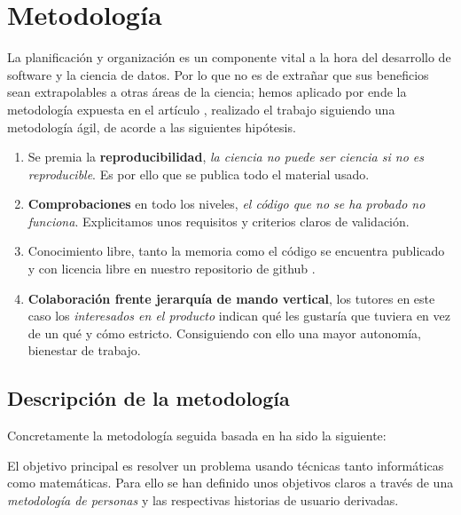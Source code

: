 %

\chapter{Metodología}

La planificación y organización es un componente vital a la hora del desarrollo de software 
y la ciencia de datos. Por lo que no es de extrañar que sus beneficios sean extrapolables
a otras áreas de la ciencia; 
hemos aplicado por ende la 
metodología expuesta en el artículo \cite{DBLP:journals/corr/abs-2104-12545}, realizado 
el trabajo siguiendo una metodología ágil, de acorde a las siguientes hipótesis. 

\begin{enumerate}
    \item Se premia la \textbf{reproducibilidad}, \textit{la ciencia no puede ser ciencia si no es reproducible}. Es por 
    ello que se publica todo el material usado. 
    \item \textbf{Comprobaciones} en todo los niveles, \textit{el código que no se ha probado no funciona}. 
    Explicitamos unos requisitos y criterios claros de validación. 
    \item Conocimiento libre, tanto la memoria como el código se encuentra publicado y con licencia libre en nuestro repositorio 
    de github \cite{TFG-Estudio-de-las-redes-neuronales}.
    \item \textbf{Colaboración frente jerarquía de mando vertical}, los tutores en este caso 
    los \textit{interesados en el producto} 
    indican qué les gustaría que tuviera en vez de un qué y cómo estricto. Consiguiendo con ello una mayor autonomía, bienestar de trabajo.
     
\end{enumerate}  

\section{Descripción de la metodología }  

Concretamente la metodología seguida basada en \cite{que-es-un-trabajo-fin-de-x} ha sido la siguiente: 

El objetivo principal es resolver un problema usando técnicas tanto informáticas como matemáticas. Para ello 
se han definido unos objetivos claros a través de una \textit{metodología de personas}  \cite{personas-why-and-how-you-should-use-them}
y las respectivas historias de usuario derivadas.   

